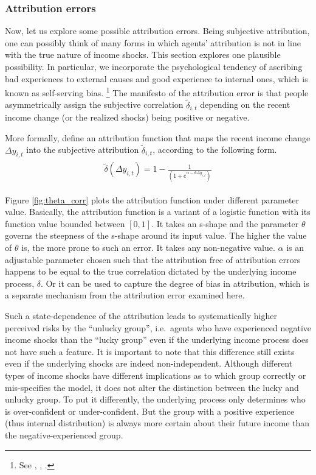 \documentclass[12pt,notitlepage,onecolumn,aps,pra]{article}
\begin{document}
    \hypertarget{attribution-errors}{%
\subsubsection{Attribution errors}\label{attribution-errors}}

Now, let us explore some possible attribution errors. Being subjective
attribution, one can possibly think of many forms in which agents'
attribution is not in line with the true nature of income shocks. This
section explores one plausible possibility. In particular, we
incorporate the psychological tendency of ascribing bad experiences to
external causes and good experience to internal ones, which is known as
self-serving bias.
\footnote{See \cite{al1993attributional}, \cite{campbell1999self}, \cite{seidel2010blame}.}
The manifesto of the attribution error is that people asymmetrically
assign the subjective correlation \(\tilde \delta_{i,t}\) depending on
the recent income change (or the realized shocks) being positive or
negative.

More formally, define an attribution function that maps the recent
income change \(\Delta y_{i,t}\) into the subjective attribution
\(\tilde \delta_{i,t}\), according to the following form.
\begin{eqnarray}
\begin{split}
\tilde \delta(\Delta y_{i,t}) = 1- \frac{1}{(1+e^{\alpha-\theta \Delta y_{i,t}})}
\end{split}
\end{eqnarray}

Figure \ref{fig:theta_corr} plots the attribution function under
different parameter value. Basically, the attribution function is a
variant of a logistic function with its function value bounded between
\([0,1]\). It takes an s-shape and the parameter \(\theta\) governs the
steepness of the s-shape around its input value. The higher the value of
\(\theta\) is, the more prone to such an error. It takes any
non-negative value. \(\alpha\) is an adjustable parameter chosen such
that the attribution free of attribution errors happens to be equal to
the true correlation dictated by the underlying income process,
\(\delta\). Or it can be used to capture the degree of bias in
attribution, which is a separate mechanism from the attribution error
examined here.

Such a state-dependence of the attribution leads to systematically
higher perceived risks by the ``unlucky group'', i.e.~agents who have
experienced negative income shocks than the ``lucky group'' even if the
underlying income process does not have such a feature. It is important
to note that this difference still exists even if the underlying shocks
are indeed non-independent. Although different types of income shocks
have different implications as to which group correctly or mis-specifies
the model, it does not alter the distinction between the lucky and
unlucky group. To put it differently, the underlying process only
determines who is over-confident or under-confident. But the group with
a positive experience (thus internal distribution) is always more
certain about their future income than the negative-experienced group.
\end{document}
